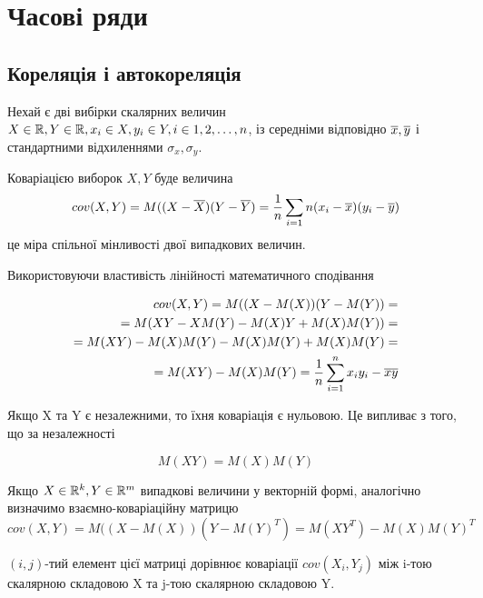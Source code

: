 \section{Часові ряди}

\subsection{Кореляція і автокореляція}

Нехай є дві вибірки скалярних величин $X \in \Bbb R , Y\in \Bbb R, x_i \in X, y_i \in Y, i \in 1, 2, \ldots, n$, із середніми відповідно $\overline{x}, \overline{y}$ і стандартними відхиленнями $\sigma_x, \sigma_y$.

\begin{ozn}
Коваріацією виборок $X, Y$ буде величина 
\begin{equation}
 cov(X,Y) = M((X - \overline{X})(Y - \overline{Y}) = \frac{1}{n} \sum_{i = 1}{n} (x_i - \overline{x})(y_i - \overline{y})
\end{equation}
це міра спільної мінливості двої випадкових величин.

Використовуючи властивість лінійності математичного сподівання

\begin{equation}
\begin{split}
 cov(X,Y) = M((X - M(X))(Y - M(Y)) = \\
 = M(XY - XM(Y) - M(X)Y + M(X)M(Y)) = \\
 = M(XY) - M(X)M(Y) - M(X)M(Y) + M(X)M(Y) = \\
 = M(XY) - M(X)M(Y) = \frac{1}{n} \sum_{i = 1}^{n} x_i y_i - \overline{x} \overline{y}
\end{split}
\end{equation}

Якщо X та Y є незалежними, то їхня коваріація є нульовою. Це випливає з того, що за незалежності

\begin{equation}
M(XY) = M(X)M(Y)
\end{equation}



Якщо $X\in \Bbb R^k, Y\in \Bbb R^m$ випадкові величини у векторній формі, аналогічно визначимо взаємно-коваріаційну матрицю
\begin{equation}
cov(X,Y) = M((X - M(X))(Y - M(Y)^T) = M(XY^T) - M(X)M(Y)^T
\end{equation}

$(i, j)$-тий елемент цієї матриці дорівнює коваріації $cov(X_i, Y_j)$ між i-тою скалярною складовою X та j-тою скалярною складовою Y.
\end{ozn}


